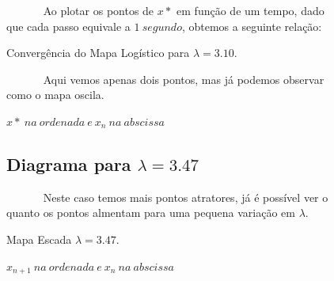 \documentclass[pdftex,12pt,a4paper]{article}
\begin{document}
\begin{figure}
~~~~~~ Ao plotar os pontos de $x*$ em função de um tempo, dado que cada passo equivale a $1\ segundo$, obtemos a seguinte relação:

\centering
\caption{Convergência do Mapa Logístico para $\lambda = 3.10$.}
\caption*{$x*\ na\ ordenada\ e\ x_{n}\ na\ abscissa$ }

~~~~~~ Aqui vemos apenas dois pontos, mas já podemos observar como o mapa oscila.
\end{figure}

\begin{figure}
\subsection{Diagrama para $\lambda = 3.47$}

~~~~~~ Neste caso temos mais pontos atratores, já é possível ver o quanto os pontos almentam para uma pequena variação em $\lambda$.

\centering
\caption{Mapa Escada $\lambda = 3.47$.}
\caption*{$x_{n+1}\ na\ ordenada\ e\ x_{n}\ na\ abscissa$ }
\end{figure}
\end{document}
